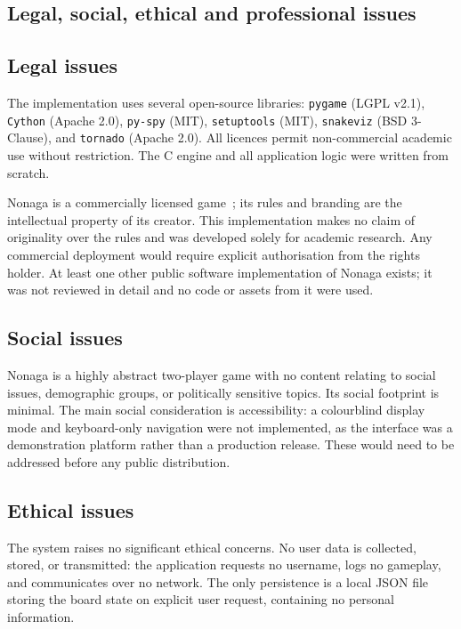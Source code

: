 \begin{appendices}
\section{Legal, social, ethical and professional issues}

\subsection{Legal issues}

The implementation uses several open-source libraries: \texttt{pygame} (LGPL v2.1), \texttt{Cython} (Apache 2.0), \texttt{py-spy} (MIT), \texttt{setuptools} (MIT), \texttt{snakeviz} (BSD 3-Clause), and \texttt{tornado} (Apache 2.0). All licences permit non-commercial academic use without restriction. The C engine and all application logic were written from scratch.

Nonaga is a commercially licensed game~\cite{nonaga_rules}; its rules and branding are the intellectual property of its creator. This implementation makes no claim of originality over the rules and was developed solely for academic research. Any commercial deployment would require explicit authorisation from the rights holder. At least one other public software implementation of Nonaga exists; it was not reviewed in detail and no code or assets from it were used.

\subsection{Social issues}

Nonaga is a highly abstract two-player game with no content relating to social issues, demographic groups, or politically sensitive topics. Its social footprint is minimal. The main social consideration is accessibility: a colourblind display mode and keyboard-only navigation were not implemented, as the interface was a demonstration platform rather than a production release. These would need to be addressed before any public distribution.

\subsection{Ethical issues}

The system raises no significant ethical concerns. No user data is collected, stored, or transmitted: the application requests no username, logs no gameplay, and communicates over no network. The only persistence is a local JSON file storing the board state on explicit user request, containing no personal information.


\end{appendices}
